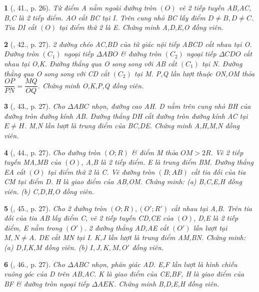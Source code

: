 \documentclass{article}
\newtheorem{baitoan}{}
\begin{document}
\begin{baitoan}[\cite{Thu_Chung_Viet_Minh_circ}, 41., p. 26]
	Từ điểm A nằm ngoài đường tròn $(O)$ vẽ 2 tiếp tuyến AB,AC, B,C là 2 tiếp điểm. AO cắt BC tại I. Trên cung nhỏ BC lấy điểm $D\ne B,D\ne C$. Tia DI cắt $(O)$ tại điểm thứ 2 là E. Chứng minh A,D,E,O đồng viên.
\end{baitoan}

\begin{baitoan}[\cite{Thu_Chung_Viet_Minh_circ}, 42., p. 27]
	2 đường chéo AC,BD của tứ giác nội tiếp ABCD cắt nhau tại O. Đường tròn $(C_1)$ ngoại tiếp $\Delta ABO$ \& đường tròn $(C_2)$ ngoại tiếp $\Delta CDO$ cắt nhau tại O,K. Đường thẳng qua O song song với AB cắt $(C_1)$ tại N. Đường thẳng qua O song song với CD cắt $(C_2)$ tại M. P,Q lần lượt thuộc ON,OM thỏa $\dfrac{OP}{PN} = \dfrac{MQ}{OQ}$. Chứng minh O,K,P,Q đồng viên.
\end{baitoan}

\begin{baitoan}[\cite{Thu_Chung_Viet_Minh_circ}, 43., p. 27]
	Cho $\Delta ABC$ nhọn, đường cao AH. D nằm trên cung nhỏ BH của đường tròn đường kính AB. Đường thẳng DH cắt đường tròn đường kính AC tại $E\ne H$. M,N lần lượt là trung điểm của BC,DE. Chứng minh A,H,M,N đồng viên.
\end{baitoan}

\begin{baitoan}[\cite{Thu_Chung_Viet_Minh_circ}, 44., p. 27]
	Cho đường tròn $(O;R)$ \& điểm M thỏa $OM > 2R$. Vẽ 2 tiếp tuyến MA,MB của $(O)$, A,B là 2 tiếp điểm. E là trung điểm BM. Đường thẳng EA cắt $(O)$ tại điểm thứ 2 là C. Vẽ đường tròn $(B;AB)$ cắt tia đối của tia CM tại điểm D. H là giao điểm của AB,OM. Chứng minh: (a) B,C,E,H đồng viên. (b) C,D,H,O đồng viên.
\end{baitoan}

\begin{baitoan}[\cite{Thu_Chung_Viet_Minh_circ}, 45., p. 27]
	Cho 2 đường tròn $(O;R),(O';R')$ cắt nhau tại A,B. Trên tia đối của tia AB lấy điểm C, vẽ 2 tiếp tuyến CD,CE của $(O)$, D,E là 2 tiếp điểm, E nằm trong $(O')$. 2 đường thẳng AD,AE cắt $(O')$ lần lượt tại $M,N\ne A$. DE cắt MN tại I. K,J lần lượt là trung điểm AM,BN. Chứng minh: (a) D,I,K,M đồng viên. (b) $I,J,K,M,O'$ đồng viên.
\end{baitoan}

\begin{baitoan}[\cite{Thu_Chung_Viet_Minh_circ}, 46., p. 27]
	Cho $\Delta ABC$ nhọn, phân giác AD. E,F lần lượt là hình chiếu vuông góc của D trên AB,AC. K là giao điểm của CE,BF, H là giao điểm của BF \& đường tròn ngoại tiếp $\Delta AEK$. Chứng minh B,D,E,H đồng viên.
\end{baitoan}
\end{document}
